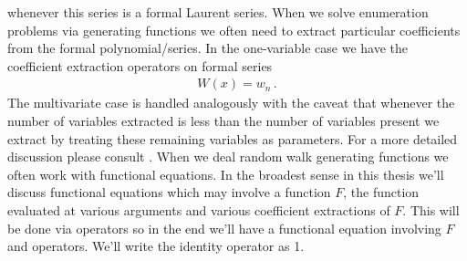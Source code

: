 whenever this series is a formal Laurent series. When we solve enumeration problems via generating functions we often need to extract particular coefficients from the formal polynomial/series. In the one-variable case we have the coefficient extraction operators on formal series
\begin{align}
	[x^n] W(x) = w_n\,.
\end{align}
The multivariate case is handled analogously with the caveat that whenever the number of variables extracted is less than the number of variables present we extract by treating these remaining variables as parameters. For a more detailed discussion please consult \cite{goulden2004comb}. When we deal random walk generating functions we often work with functional equations. In the broadest sense in this thesis we'll discuss functional equations which may involve a function $F$, the function evaluated at various arguments and various coefficient extractions of $F$. This will be done via operators so in the end we'll have a functional equation involving $F$ and operators. We'll write the identity operator as 1.
